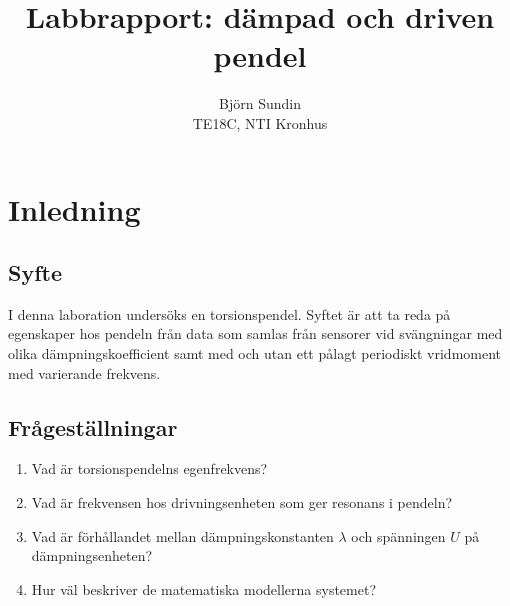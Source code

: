 \documentclass[12pt, a4paper]{article}
\title{Labbrapport: dämpad och driven pendel}
\author{Björn Sundin\medskip\\ TE18C, NTI Kronhus}
\begin{document}
\maketitle

\section{Inledning}
\subsection{Syfte}
I denna laboration undersöks en torsionspendel. Syftet är att ta reda på egenskaper hos pendeln från data som samlas från sensorer vid svängningar med olika dämpnings\-koefficient samt med och utan ett pålagt periodiskt vridmoment med varierande frekvens.
\subsection{Frågeställningar}
\begin{enumerate}
    \item Vad är torsionspendelns egenfrekvens?
    \item Vad är frekvensen hos drivningsenheten som ger resonans i pendeln?
    \item Vad är förhållandet mellan dämpningskonstanten $\lambda$ och spänningen $U$ på dämp\-ningsenheten?
    \item Hur väl beskriver de matematiska modellerna systemet?
\end{enumerate}
\end{document}
